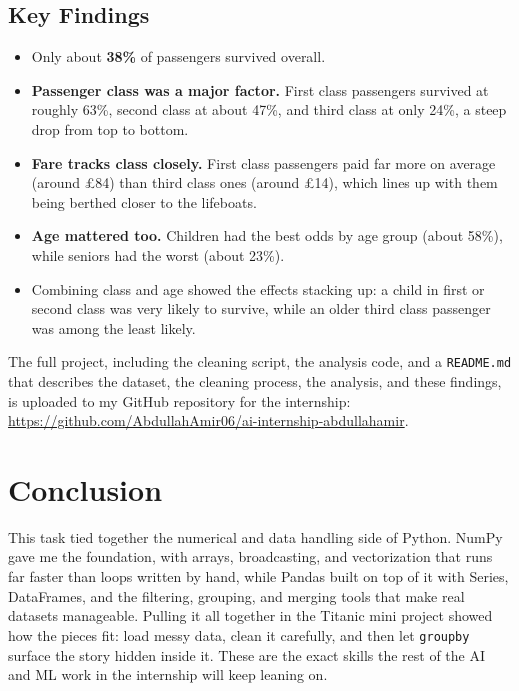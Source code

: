 \documentclass[11pt,a4paper]{article}
\begin{document}
\subsection*{Key Findings}
\begin{itemize}[leftmargin=1.4em]
    \item Only about \textbf{38\%} of passengers survived overall.
    \item \textbf{Passenger class was a major factor.} First class passengers survived at roughly 63\%, second class at about 47\%, and third class at only 24\%, a steep drop from top to bottom.
    \item \textbf{Fare tracks class closely.} First class passengers paid far more on average (around \pounds84) than third class ones (around \pounds14), which lines up with them being berthed closer to the lifeboats.
    \item \textbf{Age mattered too.} Children had the best odds by age group (about 58\%), while seniors had the worst (about 23\%).
    \item Combining class and age showed the effects stacking up: a child in first or second class was very likely to survive, while an older third class passenger was among the least likely.
\end{itemize}

The full project, including the cleaning script, the analysis code, and a \texttt{README.md} that describes the dataset, the cleaning process, the analysis, and these findings, is uploaded to my GitHub repository for the internship: \url{https://github.com/AbdullahAmir06/ai-internship-abdullahamir}.

\section*{Conclusion}
This task tied together the numerical and data handling side of Python. NumPy gave me the foundation, with arrays, broadcasting, and vectorization that runs far faster than loops written by hand, while Pandas built on top of it with Series, DataFrames, and the filtering, grouping, and merging tools that make real datasets manageable. Pulling it all together in the Titanic mini project showed how the pieces fit: load messy data, clean it carefully, and then let \texttt{groupby} surface the story hidden inside it. These are the exact skills the rest of the AI and ML work in the internship will keep leaning on.

\end{document}
